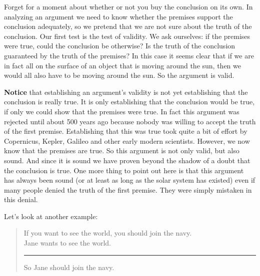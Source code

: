 \documentclass[]{book}
\newenvironment{argument}{\begin{quote}\normalsize}{\end{quote}}
\begin{document}
Forget for a moment about whether or not you buy the conclusion on its own. In analyzing an argument we need to know whether the premises support the conclusion adequately, so we pretend that we are not sure about the truth of the conclusion. Our first test is the test of validity. We ask ourselves: if the premises were true, could the conclusion be otherwise? Is the truth of the conclusion guaranteed by the truth of the premises? In this case it seems clear that if we are in fact all on the surface of an object that is moving around the sun, then we would all also have to be moving around the sun. So the argument is valid.

\textbf{Notice} that establishing an argument's validity is not yet establishing that the conclusion is really true. It is only establishing that the conclusion would be true, if only we could show that the premises were true. In fact this argument was rejected until about 500 years ago because nobody was willing to accept the truth of the first premise. Establishing that this was true took quite a bit of effort by Copernicus, Kepler, Galileo and other early modern scientists. However, we now know that the premises are true. So this argument is not only valid, but also sound. And since it is sound we have proven beyond the shadow of a doubt that the conclusion is true. One more thing to point out here is that this argument has always been sound (or at least as long as the solar system has existed) even if many people denied the truth of the first premise. They were simply mistaken in this denial.

Let's look at another example:

\begin{argument}
If you want to see the world, you should join the navy.\\
Jane wants to see the world.\\

\begin{center}\rule{0.5\linewidth}{\linethickness}\end{center}

So Jane should join the navy.
\end{argument}
\end{document}
